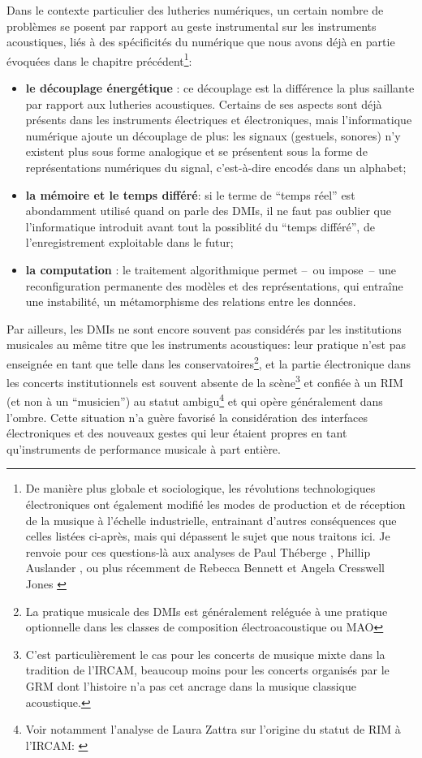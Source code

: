 \noindent Dans le contexte particulier des lutheries numériques, un certain nombre de problèmes se posent par rapport au geste instrumental sur les instruments acoustiques, liés à des spécificités du numérique que nous avons déjà en partie évoquées dans le chapitre précédent\footnote{De manière plus globale et sociologique, les révolutions technologiques électroniques ont également modifié les modes de production et de réception de la musique à l'échelle industrielle, entrainant d'autres conséquences que celles listées ci-après, mais qui dépassent le sujet que nous traitons ici. Je renvoie pour ces questions-là aux analyses de Paul Théberge \cite{theberge_any_1997}, Phillip Auslander \cite{auslander_liveness:_2008}, ou plus récemment de Rebecca Bennett et Angela Cresswell Jones \cite{jones_digital_2015}}:
\vspace{-1em}
\begin{itemize}[noitemsep]
	\item \textbf{le découplage énergétique} : ce découplage est la différence la plus saillante par rapport aux lutheries acoustiques. Certains de ses aspects sont déjà présents dans les instruments électriques et électroniques, mais l'informatique numérique ajoute un découplage de plus: les signaux (gestuels, sonores) n'y existent plus sous forme analogique et se présentent sous la forme de représentations numériques du signal, c'est-à-dire encodés dans un alphabet;
	\item \textbf{la mémoire et le temps différé}: si le terme de ``temps réel'' est abondamment utilisé quand on parle des \glspl{DMI}, il ne faut pas oublier que l'informatique introduit avant tout la possiblité du ``temps différé'', de l'enregistrement exploitable dans le futur;
	\item \textbf{la computation} : le traitement algorithmique permet --~ou impose~-- une reconfiguration permanente des modèles et des représentations, qui entraîne une instabilité, un métamorphisme des relations entre les données.
\end{itemize}
\noindent Par ailleurs, les \glspl{DMI} ne sont encore souvent pas considérés par les institutions musicales au même titre que les instruments acoustiques: leur pratique n'est pas enseignée en tant que telle dans les conservatoires\footnote{La pratique musicale des \glspl{DMI} est généralement reléguée à une pratique optionnelle dans les classes de composition électroacoustique ou \gls{MAO}}, et la partie électronique dans les concerts institutionnels est souvent absente de la scène\footnote{C'est particulièrement le cas pour les concerts de musique mixte dans la tradition de l'\gls{IRCAM}, beaucoup moins pour les concerts organisés par le \gls{GRM} dont l'histoire n'a pas cet ancrage dans la musique classique acoustique.} et confiée à un \gls{RIM} (et non à un ``musicien'') au statut ambigu\footnote{Voir notamment l'analyse de Laura Zattra sur l'origine du statut de \gls{RIM} à l'\gls{IRCAM}: \cite{zattra_les_2013}} et qui opère généralement dans l'ombre. Cette situation n'a guère favorisé la considération des interfaces électroniques et des nouveaux gestes qui leur étaient propres en tant qu'instruments de performance musicale à part entière.

